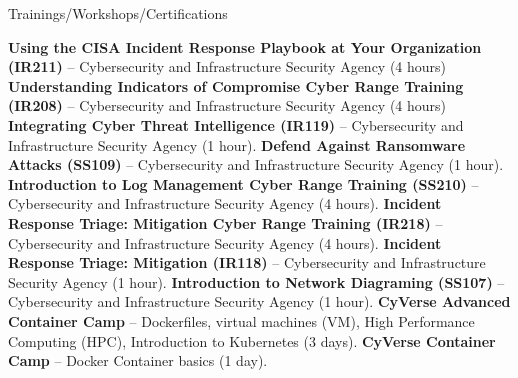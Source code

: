 \begin{rubric}{Trainings/Workshops/Certifications}

\entry*[6/24/2025] \textbf{Using the CISA Incident Response Playbook at Your Organization (IR211)} -- Cybersecurity and Infrastructure Security Agency (4 hours) \href{https://github.com/amantaya/curriculum-vitae/blob/master/certifications/IR211_JUN24-2025_CertificateofAttendance.pdf}{\scriptsize\faLink}
\entry*[6/10/2025] \textbf{Understanding Indicators of Compromise Cyber Range Training (IR208)} -- Cybersecurity and Infrastructure Security Agency (4 hours) \href{https://github.com/amantaya/curriculum-vitae/blob/master/certifications/IR208_June10_2025_Course_Completion_Certificate.pdf}{\scriptsize\faLink}
\entry*[6/09/2025] \textbf{Integrating Cyber Threat Intelligence (IR119)} -- Cybersecurity and Infrastructure Security Agency (1 hour). \href{https://github.com/amantaya/curriculum-vitae/blob/master/certifications/IR119_CoC_060925%201.pdf}{\scriptsize\faLink}
\entry*[5/28/2025] \textbf{Defend Against Ransomware Attacks (SS109)} -- Cybersecurity and Infrastructure Security Agency (1 hour). \href{https://github.com/amantaya/curriculum-vitae/blob/master/certifications/SS109_MAY28-2025_CertificateofAttendance.pdf}{\scriptsize\faLink}
\entry*[5/22/2025] \textbf{Introduction to Log Management Cyber Range Training (SS210)} -- Cybersecurity and Infrastructure Security Agency (4 hours). \href{https://github.com/amantaya/curriculum-vitae/blob/master/certifications/SS210_May22_2025_Course_Completion_Certificate.pdf}{\scriptsize\faLink}
\entry*[5/15/2025] \textbf{Incident Response Triage: Mitigation Cyber Range Training (IR218)} -- Cybersecurity and Infrastructure Security Agency (4 hours). \href{https://github.com/amantaya/CV/blob/master/certifications/IR218_COA_051525.pdf}{\scriptsize\faLink}
\entry*[5/12/2025] \textbf{Incident Response Triage: Mitigation (IR118)} -- Cybersecurity and Infrastructure Security Agency (1 hour). \href{https://github.com/amantaya/curriculum-vitae/blob/master/certifications/IR118_CoA_051225.pdf}{\scriptsize\faLink}
\entry*[4/01/2025] \textbf{Introduction to Network Diagraming (SS107)} -- Cybersecurity and Infrastructure Security Agency (1 hour). \href{https://github.com/amantaya/CV/blob/master/certifications/SS107_APR1-2025_CertificateofAttendance.pdf}{\scriptsize\faLink}
\entry*[5/2022] \textbf{CyVerse Advanced Container Camp} -- Dockerfiles, virtual machines (VM), High Performance Computing (HPC), Introduction to Kubernetes (3 days).
\entry*[3/2021] \textbf{CyVerse Container Camp} -- Docker Container basics (1 day).


\end{rubric}
